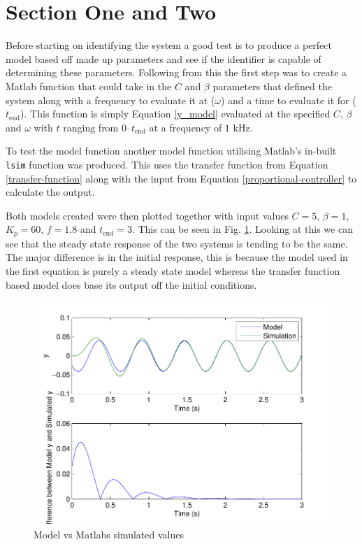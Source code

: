 \section*{Section One and Two}

Before starting on identifying the system a good test is to produce a perfect
model based off made up parameters and see if the identifier is capable of
determining these parameters.  Following from this the first step was to create
a Matlab function that could take in the $C$ and $\beta$ parameters that defined
the system along with a frequency to evaluate it at ($\omega$) and a time to
evaluate it for ($t_\text{end}$).  This function is simply Equation
\ref{y_model} evaluated at the specified $C$, $\beta$ and $\omega$ with $t$
ranging from $0$--$t_\text{end}$ at a frequency of $1$ kHz.

To test the model function another model function utilising Matlab's in-built
\texttt{lsim} function was produced.  This uses the transfer function from
Equation \ref{transfer-function} along with the input from Equation
\ref{proportional-controller} to calculate the output.

Both models created were then plotted together with input values $C = 5$, $\beta
= 1$, $K_p = 60$, $f = 1.8$ and $t_\text{end} = 3$.  This can be seen in Fig.
\ref{section-two}.  Looking at this we can see that the steady state response of
the two systems is tending to be the same.  The major difference is in the
initial response, this is because the model used in the first equation is purely
a steady state model whereas the transfer function based model does base its
output off the initial conditions.

\begin{figure}
  \centering
  \includegraphics{images/section-two}
  \caption{Model vs Matlabs simulated values\label{section-two}}
\end{figure}
